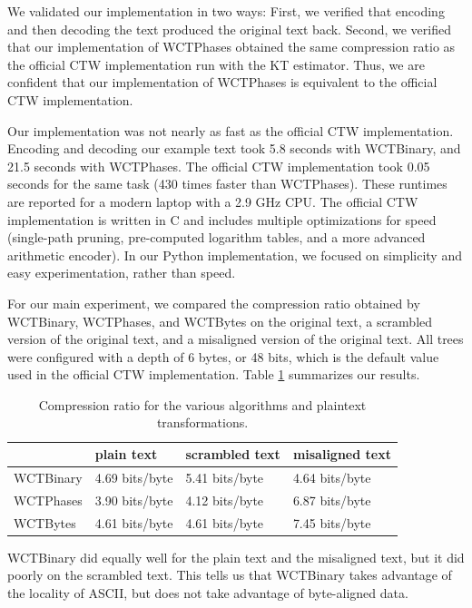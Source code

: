 \documentclass[11pt]{scrartcl}
\begin{document}
We validated our implementation in two ways: First, we verified that encoding
and then decoding the text produced the original text back. Second, we verified
that our implementation of WCTPhases obtained the same compression ratio as the
official CTW implementation run with the KT estimator. Thus, we are confident
that our implementation of WCTPhases is equivalent to the official CTW
implementation.

Our implementation was not nearly as fast as the official CTW implementation.
Encoding and decoding our example text took 5.8 seconds with WCTBinary, and
21.5 seconds with WCTPhases. The official CTW implementation took 0.05 seconds
for the same task (430 times faster than WCTPhases). These runtimes are
reported for a modern laptop with a 2.9 GHz CPU. The official CTW
implementation is written in C and includes multiple optimizations for speed
(single-path pruning, pre-computed logarithm tables, and a more advanced
arithmetic encoder). In our Python implementation, we focused on simplicity and
easy experimentation, rather than speed.

For our main experiment, we compared the compression ratio obtained by
WCTBinary, WCTPhases, and WCTBytes on the original text, a scrambled version of
the original text, and a misaligned version of the original text. All trees
were configured with a depth of 6 bytes, or 48 bits, which is the default value
used in the official CTW implementation. Table \ref{tab:results} summarizes our
results.

\begin{table}[h!]
    \centering
    \begin{tabular}{l|lll}
        & plain text & scrambled text & misaligned text \\
        \hline
        WCTBinary & 4.69 bits/byte & 5.41 bits/byte & 4.64 bits/byte \\
        WCTPhases & 3.90 bits/byte & 4.12 bits/byte & 6.87 bits/byte \\
        WCTBytes  & 4.61 bits/byte & 4.61 bits/byte & 7.45 bits/byte \\
    \end{tabular}
    \caption{Compression ratio for the various algorithms and plaintext
    transformations.}
    \label{tab:results}
\end{table}

WCTBinary did equally well for the plain text and the misaligned text, but it
did poorly on the scrambled text. This tells us that WCTBinary takes advantage
of the locality of ASCII, but does not take advantage of byte-aligned data.
\end{document}
